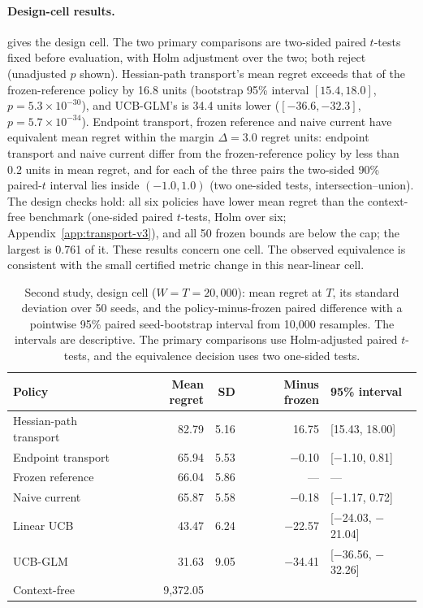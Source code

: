 \paragraph{Design-cell results.}
 gives the design cell. The two primary
comparisons are two-sided paired $t$-tests fixed before evaluation, with Holm
adjustment over the two; both reject (unadjusted $p$ shown). Hessian-path
transport's mean regret exceeds that of the frozen-reference policy by 16.8 units
(bootstrap 95\% interval $[15.4, 18.0]$, $p=5.3\times10^{-30}$), and UCB-GLM's
is 34.4 units lower ($[-36.6, -32.3]$, $p=5.7\times10^{-34}$). Endpoint
transport, frozen reference and naive current have equivalent mean regret
within the margin $\Delta=3.0$ regret units: endpoint transport and naive
current differ from the frozen-reference policy by less than 0.2 units in mean
regret, and for each of the three pairs the two-sided 90\% paired-$t$ interval
lies inside $(-1.0,1.0)$ (two one-sided tests, intersection--union). The
design checks hold: all six policies have lower mean regret than the
context-free benchmark (one-sided paired $t$-tests, Holm over six;
Appendix~\ref{app:transport-v3}), and all 50 frozen bounds are below the cap;
the largest is 0.761 of it. These results concern one cell. The observed
equivalence is consistent with the small certified metric change in this
near-linear cell.

\begin{table}[H]
\centering
\caption{Second study, design cell ($W=T=20{,}000$): mean regret at $T$, its
standard deviation over 50 seeds, and the
policy-minus-frozen paired difference with a pointwise 95\% paired
seed-bootstrap interval from 10,000 resamples. The intervals are descriptive.
The primary comparisons use Holm-adjusted paired $t$-tests, and the
equivalence decision uses two one-sided tests.}
\label{tab:transport-v3-design}
\begin{tabular}{@{}lrrrl@{}}
\toprule
Policy & Mean regret & SD & Minus frozen & 95\% interval \\
\midrule
Hessian-path transport & 82.79 & 5.16 & 16.75 & [15.43, 18.00] \\
Endpoint transport & 65.94 & 5.53 & $-$0.10 & [$-$1.10, 0.81] \\
Frozen reference & 66.04 & 5.86 & --- & --- \\
Naive current & 65.87 & 5.58 & $-$0.18 & [$-$1.17, 0.72] \\
Linear UCB & 43.47 & 6.24 & $-$22.57 & [$-$24.03, $-$21.04] \\
UCB-GLM & 31.63 & 9.05 & $-$34.41 & [$-$36.56, $-$32.26] \\
Context-free & 9{,}372.05 & & & \\
\bottomrule
\end{tabular}
\end{table}


